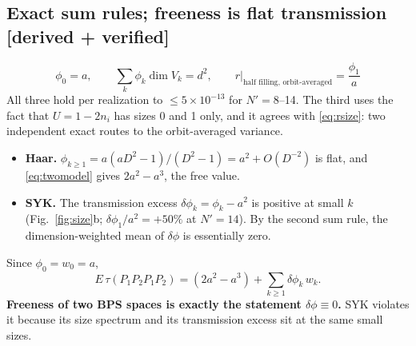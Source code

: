 \documentclass[11pt]{article}
\newcommand{\Np}{N'}
\newcommand{\tagbox}[2]{\textsf{\small\color{#1}[#2]}}
\newcommand{\VER}{\tagbox{cder}{derived + verified}}
\theoremstyle{remark}
\begin{document}
\subsection{Exact sum rules; freeness is flat transmission \VER}
\begin{equation}
\phi_0=a,\qquad \sum_k\phi_k\dim V_k=d^2,\qquad r\big|_{\text{half filling, orbit-averaged}}=\frac{\phi_1}{a}
\label{eq:phisum}
\end{equation}
All three hold per realization to $\le5\times10^{-13}$ for $\Np=8$--14. The third uses the fact that $U=1-2n_i$ has
sizes 0 and 1 only, and it agrees with \eqref{eq:rsize}: two independent exact routes to the orbit-averaged variance.
\begin{itemize}\itemsep1pt
\item \textbf{Haar.} $\phi_{k\ge1}=a(aD^2-1)/(D^2-1)=a^2+O(D^{-2})$ is flat, and \eqref{eq:twomodel} gives
  $2a^2-a^3$, the free value.
\item \textbf{SYK.} The transmission excess $\delta\phi_k=\phi_k-a^2$ is positive at small $k$ (Fig.~\ref{fig:size}b;
  $\delta\phi_1/a^2=+50\%$ at $\Np=14$). By the second sum rule, the dimension-weighted mean of $\delta\phi$ is
  essentially zero.
\end{itemize}
Since $\phi_0=w_0=a$,
\begin{equation}
E\,\tau(P_1P_2P_1P_2)=(2a^2-a^3)+\sum_{k\ge1}\delta\phi_k\,w_k .
\end{equation}
\textbf{Freeness of two BPS spaces is exactly the statement $\delta\phi\equiv0$.} SYK violates it because its size
spectrum and its transmission excess sit at the same small sizes.
\end{document}
